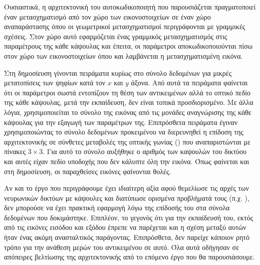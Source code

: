 Ουσιαστικά, η αρχιτεκτονική του αυτο\textendash κωδικοποιητή που παρουσιάζεται πραγματοποιεί έναν μετασχηματισμό από τον χώρο των εικονοστοιχείων σε έναν χώρο αναπαράστασης όπου οι γεωμετρικοί μετασχηματισμοί περιγράφονται με γραμμικές σχέσεις. Στον χώρο αυτό εφαρμόζεται ένας γραμμικός μετασχηματισμός στις παραμέτρους της κάθε κάψουλας και έπειτα, οι παράμετροι αποκωδικοποιούνται πίσω στον χώρο των εικονοστοιχείων όπου και λαμβάνεται η μετασχηματισμένη εικόνα.\par

Στη δημοσίευση γίνονται πειράματα κυρίως στο σύνολο δεδομένων \cite{lecun1998gradientMNIST} για μικρές μετατοπίσεις των ψηφίων κατά τον $x$ και $y$ άξονα. Από αυτά τα πειράματα φαίνεται ότι οι παράμετροι σωστά εντοπίζουν τη θέση των αντικειμένων αλλά το οπτικό πεδίο της κάθε κάψουλας, μετά την εκπαίδευση, δεν είναι τοπικά προσδιορισμένο. Με άλλα λόγια, χρησιμοποιείται το σύνολο της εικόνας από τις μονάδες αναγνώρισης της κάθε κάψουλας για την εξαγωγή των παραμέτρων της. Επιπρόσθετα πειράματα έγιναν χρησιμοποιώντας το σύνολο δεδομένων \cite{lecun2004learning} προκειμένου να διερευνηθεί η επίδοση της αρχιτεκτονικής σε σύνθετες μεταβολές της οπτικής γωνίας () που αναπαριστώνται με πίνακες $3\times3$. Για αυτό το σύνολο αυξήθηκε ο αριθμός των καψουλών του δικτύου και αυτές είχαν πεδίο υποδοχής που δεν κάλυπτε όλη την εικόνα. Όπως φαίνεται και στη δημοσίευση\cite{hinton2011transforming}, οι παραχθείσες εικόνες φαίνονται θολές.\par

Αν και το έργο που περιγράφουμε έχει ιδιαίτερη αξία αφού θεμελίωσε τις αρχές των νευρωνικών δικτύων με κάψουλες και διατύπωσε ορισμένα προβλήματά τους (π.χ. ), δεν μπορούσε να έχει πρακτική εφαρμογή λόγω της επίδοσής του στα σύνολα δεδομένων που δοκιμάστηκε. Επιπλέον, το γεγονός ότι για την εκπαίδευσή του, εκτός από τις εικόνες εισόδου και εξόδου έπρεπε να παρέχεται και η σχέση μεταξύ αυτών ήταν ένας ακόμη ανασταλτικός παράγοντας. Επιπρόσθετα, δεν παρείχε κάποιον ρητό τρόπο για την ανάθεση μερών του αντικειμένου σε αυτό. Όλα αυτά οδήγησαν σε απόπειρες βελτίωσης της αρχιτεκτονικής από το επόμενο έργο που θα παρουσιάσουμε. 

\subsubsection{}

